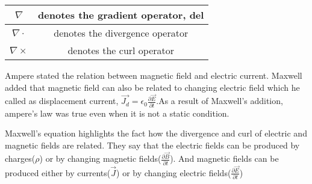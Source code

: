 \begin{center}
    \begin{tabular}{|c|c|}
    \hline
    $\nabla$  & denotes the gradient operator, del  \\
    \hline
    $\nabla\cdot$ & denotes the divergence operator \\
    \hline
    $\nabla\times$ & denotes the curl operator \\
    \hline
    \end{tabular}
\end{center}


Ampere stated the relation between magnetic field and electric current. Maxwell added that magnetic field can also be related to changing electric field which he called as displacement current, $\Vec{J_{d}}=\epsilon_{0} \frac{\partial\Vec{E}}{\partial t}$.As a result of Maxwell's addition, ampere's
law was true even when it is not a static condition.

Maxwell's equation highlights the fact how the divergence and curl of electric and magnetic fields are related. They say that the electric fields can be produced by charges($\rho$) or by changing magnetic fields($\frac{\partial\Vec{B}}{\partial t}$). And magnetic  fields can be produced either by currents($\Vec{J}$) or by changing electric fields($\frac{\partial\Vec{E}}{\partial t}$) 


